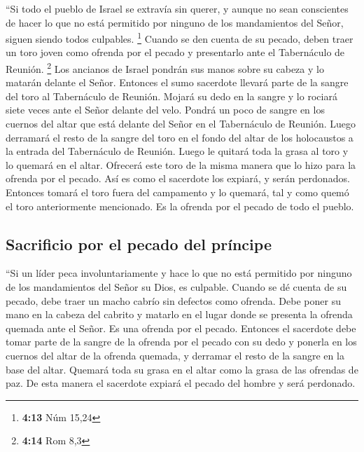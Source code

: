  ``Si todo el pueblo de Israel se extravía sin querer, y
aunque no sean conscientes de hacer lo que no está permitido por ninguno
de los mandamientos del Señor, siguen siendo todos culpables.
\footnote{\textbf{4:13} Núm 15,24}  Cuando se den cuenta
de su pecado, deben traer un toro joven como ofrenda por el pecado y
presentarlo ante el Tabernáculo de Reunión. \footnote{\textbf{4:14} Rom
  8,3}  Los ancianos de Israel pondrán sus manos sobre su
cabeza y lo matarán delante el Señor.  Entonces el sumo
sacerdote llevará parte de la sangre del toro al Tabernáculo de Reunión.
 Mojará su dedo en la sangre y lo rociará siete veces
ante el Señor delante del velo.  Pondrá un poco de sangre
en los cuernos del altar que está delante del Señor en el Tabernáculo de
Reunión. Luego derramará el resto de la sangre del toro en el fondo del
altar de los holocaustos a la entrada del Tabernáculo de Reunión.
 Luego le quitará toda la grasa al toro y lo quemará en
el altar.  Ofrecerá este toro de la misma manera que lo
hizo para la ofrenda por el pecado. Así es como el sacerdote los
expiará, y serán perdonados.  Entonces tomará el toro
fuera del campamento y lo quemará, tal y como quemó el toro
anteriormente mencionado. Es la ofrenda por el pecado de todo el pueblo.

\hypertarget{sacrificio-por-el-pecado-del-pruxedncipe}{%
\subsection{Sacrificio por el pecado del
príncipe}\label{sacrificio-por-el-pecado-del-pruxedncipe}}

 ``Si un líder peca involuntariamente y hace lo que no
está permitido por ninguno de los mandamientos del Señor su Dios, es
culpable.  Cuando se dé cuenta de su pecado, debe traer
un macho cabrío sin defectos como ofrenda.  Debe poner su
mano en la cabeza del cabrito y matarlo en el lugar donde se presenta la
ofrenda quemada ante el Señor. Es una ofrenda por el pecado.
 Entonces el sacerdote debe tomar parte de la sangre de
la ofrenda por el pecado con su dedo y ponerla en los cuernos del altar
de la ofrenda quemada, y derramar el resto de la sangre en la base del
altar.  Quemará toda su grasa en el altar como la grasa
de las ofrendas de paz. De esta manera el sacerdote expiará el pecado
del hombre y será perdonado.

